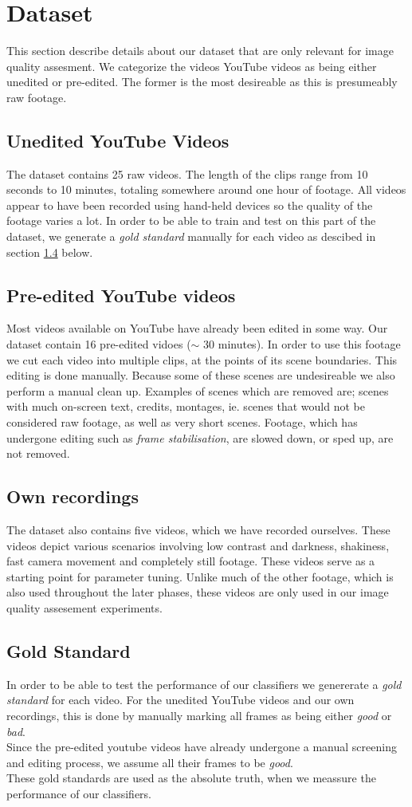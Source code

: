 \section{Dataset}
%
This section describe details about our dataset that are only relevant for image quality assesment. We categorize the videos YouTube videos as being either unedited or pre-edited. The former is the most desireable as this is presumeably raw footage.
%
\subsection{Unedited YouTube Videos}
%
The dataset contains 25 raw videos. The length of the clips range from 10 seconds to 10 minutes, totaling somewhere around one hour of footage. All videos appear to have been recorded using hand-held devices so the quality of the footage varies a lot. In order to be able to train and test on this part of the dataset, we generate a \textit{gold standard} manually for each video as descibed in section \ref{sec:goldstandard} below.
%
\subsection{Pre-edited YouTube videos}
%
Most videos available on YouTube have already been edited in some way. Our dataset contain 16 pre-edited vidoes ($\sim$ 30 minutes). In order to use this footage we cut each video into multiple clips, at the points of its scene boundaries. This editing is done manually. Because some of these scenes are undesireable we also perform a manual clean up. Examples of scenes which are removed are; scenes with much on-screen text, credits, montages, ie. scenes that would not be considered raw footage, as well as very short scenes. Footage, which has undergone editing such as \textit{frame stabilisation}, are slowed down, or sped up, are not removed.
%
\subsection{Own recordings}
%
The dataset also contains five videos, which we have recorded ourselves. These videos depict various scenarios involving low contrast and darkness, shakiness, fast camera movement and completely still footage. These videos serve as a starting point for parameter tuning. Unlike much of the other footage, which is also used throughout the later phases, these videos are only used in our image quality assesement experiments.
%
%
\subsection{Gold Standard}\label{sec:goldstandard}
%
In order to be able to test the performance of our classifiers we genererate a \textit{gold standard} for each video. For the unedited YouTube videos and our own recordings, this is done by manually marking all frames as being either \textit{good} or \textit{bad}.\\
Since the pre-edited youtube videos have already undergone a manual screening and editing process, we assume all their frames to be \textit{good}.\\
These gold standards are used as the absolute truth, when we meassure the performance of our classifiers.
%
